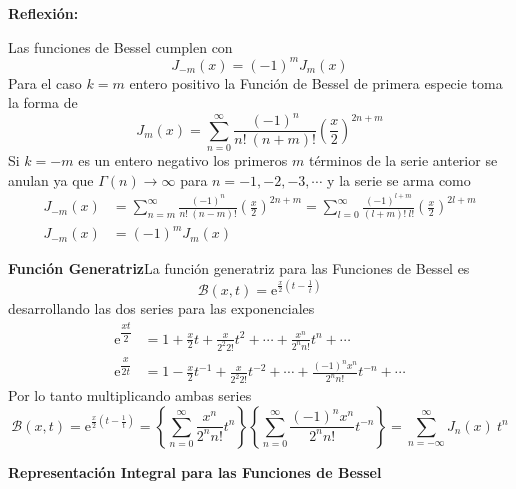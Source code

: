 \documentclass[spanish,notitlepage,letterpaper,12pt]{article}
\begin{document}
\begin{center}
\textbf{Reflexi\'{o}n:}
\end{center}

Las funciones de Bessel cumplen con
\[
J_{-m}(x)=\left(  -1\right)  ^{m}J_{m}(x)
\]
Para el caso $k=m$ entero positivo la Funci\'{o}n de Bessel de primera especie
toma la forma de
\[
J_{m}(x)=\sum_{n=0}^{\infty}\frac{\left(  -1\right)  ^{n}}{n!\ \left(
n+m\right)  !}\left(  \frac x2\right)  ^{2n+m}
\]
Si $k=-m$ es un entero negativo los primeros $m$ t\'{e}rminos de la serie
anterior se anulan ya que $\Gamma(n)\rightarrow\infty$ para $n=-1,-2,-3,\cdots
$ y la serie se arma como
\begin{align*}
J_{-m}(x)  & =\sum_{n=m}^{\infty}\frac{\left(  -1\right)  ^{n}}{n!\ \left(
n-m\right)  !}\left(  \frac x2\right)  ^{2n+m}=\sum_{l=0}^{\infty}%
\frac{\left(  -1\right)  ^{l+m}}{\left(  l+m\right)  !\ l!}\left(  \frac
x2\right)  ^{2l+m}\\
J_{-m}(x)  & =\left(  -1\right)  ^{m}J_{m}(x)
\end{align*}

\textbf{Funci\'{o}n Generatriz}\newline La funci\'{o}n generatriz para las
Funciones de Bessel es
\[
\mathcal{B}(x,t)=\mathrm{e}^{\frac x2\left(  t-\frac1t\right)  }
\]
desarrollando las dos series para las exponenciales
\begin{align*}
\mathrm{e}^{\dfrac{xt}2}  & =1+\frac x2t+\frac x{2^{2}2!}t^{2}+\cdots
+\frac{x^{n}}{2^{n}n!}t^{n}+\cdots\\
\mathrm{e}^{\dfrac x{2t}}  & =1-\frac x2t^{-1}+\frac x{2^{2}2!}t^{-2}%
+\cdots+\frac{\left(  -1\right)  ^{n}x^{n}}{2^{n}n!}t^{-n}+\cdots
\end{align*}
Por lo tanto multiplicando ambas series
\[
\mathcal{B}(x,t)=\mathrm{e}^{\frac x2\left(  t-\frac1t\right)  }=\left\{
\sum_{n=0}^{\infty}\frac{x^{n}}{2^{n}n!}t^{n}\right\}  \left\{  \sum
_{n=0}^{\infty}\frac{\left(  -1\right)  ^{n}x^{n}}{2^{n}n!}t^{-n}\right\}
=\sum_{n=-\infty}^{\infty}J_{n}(x)\ t^{n}
\]

\begin{center}
\textbf{Representaci\'{o}n Integral para las Funciones de Bessel}
\end{center}
\end{document}
